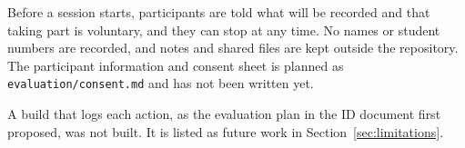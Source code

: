 Before a session starts, participants are told what will be recorded and that taking part is voluntary, and they can stop at any time. No names or student numbers are recorded, and notes and shared files are kept outside the repository. The participant information and consent sheet is planned as \texttt{evaluation/consent.md} and has not been written yet.

A build that logs each action, as the evaluation plan in the ID document first proposed, was not built. It is listed as future work in Section~\ref{sec:limitations}.
